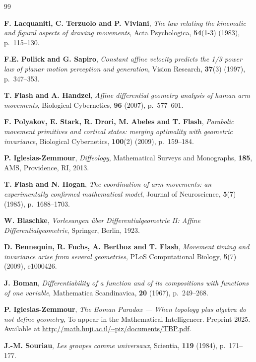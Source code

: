 \documentclass[10pt,letterpaper,reqno]{amsart}
\begin{document}
  \begin{thebibliography}{99}
    
    \textbf{F. Lacquaniti, C. Terzuolo and P. Viviani},
    \textit{The law relating the kinematic and figural aspects of drawing movements},
    Acta Psychologica,
    \textbf{54}(1-3) (1983), p.~115--130.
    
    \textbf{F.E. Pollick and G. Sapiro},
    \textit{Constant affine velocity predicts the 1/3 power law of planar motion perception and generation},
    Vision Research,
    \textbf{37}(3) (1997), p.~347--353.
    
    \textbf{T. Flash and A. Handzel},
    \textit{Affine differential geometry analysis of human arm movements},
    Biological Cybernetics,
    \textbf{96} (2007), p.~577--601.
    
    \textbf{F. Polyakov, E. Stark, R. Drori, M. Abeles and T. Flash},
    \textit{Parabolic movement primitives and cortical states: merging optimality with geometric invariance},
    Biological Cybernetics,
    \textbf{100}(2) (2009), p.~159--184.
    
    \textbf{P. Iglesias-Zemmour},
    \textit{Diffeology},
    Mathematical Surveys and Monographs,
    \textbf{185},
    AMS, Providence, RI, 2013.
    
    \textbf{T. Flash and N. Hogan},
    \textit{The coordination of arm movements: an experimentally confirmed mathematical model},
    Journal of Neuroscience,
    \textbf{5}(7) (1985), p.~1688--1703.
    
    \textbf{W. Blaschke},
    \textit{Vorlesungen über Differentialgeometrie II: Affine Differentialgeometrie},
    Springer, Berlin, 1923.
    
    \textbf{D. Bennequin, R. Fuchs, A. Berthoz and T. Flash},
    \textit{Movement timing and invariance arise from several geometries},
    PLoS Computational Biology,
    \textbf{5}(7) (2009), e1000426.
    
    \textbf{J. Boman},
    \textit{Differentiability of a function and of its compositions with functions of one variable},
    Mathematica Scandinavica,
    \textbf{20} (1967), p.~249--268.
    
    \textbf{P. Iglesias-Zemmour},
    \emph{The Boman Paradox --- When topology plus algebra do not define geometry},
    To appear in the Mathematical Intelligencer. Preprint 2025. Available at \url{http://math.huji.ac.il/~piz/documents/TBP.pdf}.
    
    \textbf{J.-M. Souriau},
    \textit{Les groupes comme universaux},
    Scientia,
    \textbf{119} (1984), p.~171--177.
  \end{thebibliography}
  
  
\end{document}
